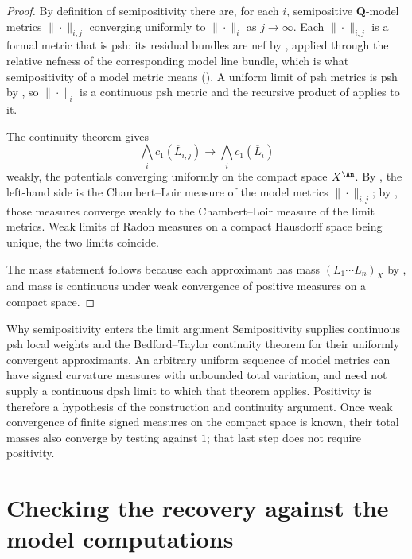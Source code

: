 \begin{proof}
By definition of semipositivity there are, for each $i$, semipositive
$\mathbf Q$-model metrics $\|\cdot\|_{i,j}$ converging uniformly to
$\|\cdot\|_i$ as $j\to\infty$.  Each $\|\cdot\|_{i,j}$ is a formal
metric that is psh: its residual bundles are nef by
, applied through the relative nefness of
the corresponding model line bundle, which is what semipositivity of a model
metric means ().  A uniform limit of
psh metrics is psh by , so
$\|\cdot\|_i$ is a continuous psh metric and the recursive product of
 applies to it.

The continuity theorem  gives
\[
 \bigwedge_ic_1(\overline L_{i,j})\longrightarrow\bigwedge_ic_1(\overline L_i)
\]
weakly, the potentials converging uniformly on the compact space
$X^{\An}$.  By , the left-hand side is the
Chambert--Loir measure of the model metrics $\|\cdot\|_{i,j}$; by
, those measures converge weakly to the
Chambert--Loir measure of the limit metrics.  Weak limits of Radon measures
on a compact Hausdorff space being unique, the two limits coincide.

The mass statement follows because each approximant has mass
$(L_1\cdots L_n)_X$ by , and mass is continuous
under weak convergence of positive measures on a compact space.
\end{proof}

\begin{warning}{Why semipositivity enters the limit argument}
Semipositivity supplies continuous psh local weights and the
Bedford--Taylor continuity theorem for their uniformly convergent
approximants.  An arbitrary uniform sequence of model metrics can have
signed curvature measures with unbounded total variation, and need not
supply a continuous dpsh limit to which that theorem applies.
Positivity is therefore a hypothesis of the construction and continuity
argument.  Once weak convergence of finite signed measures on the compact
space is known, their total masses also converge by testing against $1$;
that last step does not require positivity.
\end{warning}

\section{Checking the recovery against the model computations}
\label{sec:ch17-cl-checks}

